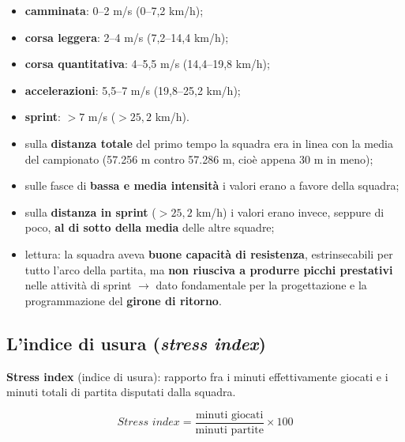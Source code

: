 \begin{itemize}
  \item \textbf{camminata}: 0--2 m/s (0--7,2 km/h);
  \item \textbf{corsa leggera}: 2--4 m/s (7,2--14,4 km/h);
  \item \textbf{corsa quantitativa}: 4--5,5 m/s (14,4--19,8 km/h);
  \item \textbf{accelerazioni}: 5,5--7 m/s (19,8--25,2 km/h);
  \item \textbf{sprint}: $> 7$ m/s ($> 25,2$ km/h).
\end{itemize}

\begin{itemize}
  \item sulla \textbf{distanza totale} del primo tempo la squadra era in linea con la media del
    campionato (57.256 m contro 57.286 m, cioè appena 30 m in meno);
  \item sulle fasce di \textbf{bassa e media intensità} i valori erano a favore della squadra;
  \item sulla \textbf{distanza in sprint} ($> 25,2$ km/h) i valori erano invece, seppure di poco,
    \textbf{al di sotto della media} delle altre squadre;
  \item lettura: la squadra aveva \textbf{buone capacità di resistenza}, estrinsecabili per tutto
    l'arco della partita, ma \textbf{non riusciva a produrre picchi prestativi} nelle attività di
    sprint $\rightarrow$ dato fondamentale per la progettazione e la programmazione del
    \textbf{girone di ritorno}.
\end{itemize}

\subsection{L'indice di usura (\texorpdfstring{\textit{stress index}}{stress index})}

\textbf{Stress index} (indice di usura): rapporto fra i minuti effettivamente giocati e i minuti
totali di partita disputati dalla squadra.

\[
  \textit{Stress index} = \frac{\textrm{minuti giocati}}{\textrm{minuti partite}} \times 100
\]


